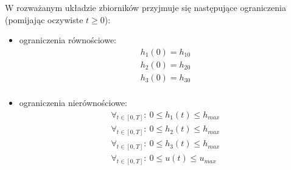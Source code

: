 W rozważanym układzie zbiorników przyjmuje się następujące ograniczenia (pomijając oczywiste $t \geq 0$):
\begin{itemize}
    \item ograniczenia równościowe:
    \begin{equation}\label{eq:model-eq-const}
    \begin{array}{lr}
        h_{1}(0) = h_{10}\\
        h_{2}(0) = h_{20}\\
        h_{3}(0) = h_{30}\\
    \end{array}
    \end{equation}
    \item ograniczenia nierównościowe:
    \begin{equation}\label{eq:model-noneq-const}
    \begin{array}{lr}
        \forall_{t \in [0, T]}:~ 0 \leq h_{1}(t) \leq h_{max}\\
        \forall_{t \in [0, T]}:~ 0 \leq h_{2}(t) \leq h_{max}\\
        \forall_{t \in [0, T]}:~ 0 \leq h_{3}(t) \leq h_{max}\\
        \forall_{t \in [0, T]}:~ 0 \leq u(t) \leq u_{max}
    \end{array}
    \end{equation}
\end{itemize}
